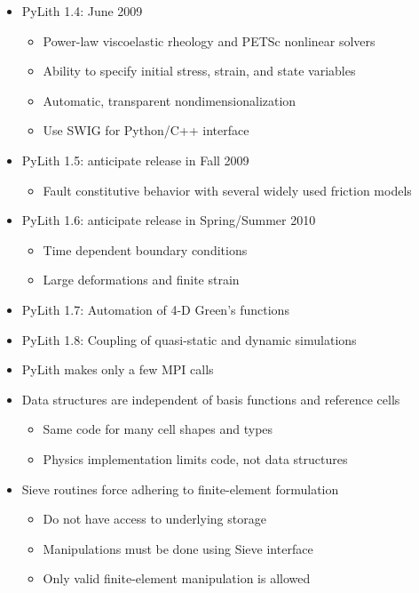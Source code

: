 \documentclass[pdftex,cig,slideColor]{pp4slides}
\begin{document}

  \begin{itemize}
  \item PyLith 1.4: June 2009
    \begin{itemize}
    \item Power-law viscoelastic rheology and PETSc nonlinear solvers
    \item Ability to specify initial stress, strain, and state variables
    \item Automatic, transparent nondimensionalization
    \item Use SWIG for Python/C++ interface
    \end{itemize}
  \item PyLith 1.5: anticipate release in Fall 2009
    \begin{itemize}
    \item Fault constitutive behavior with several widely used friction models
    \end{itemize}
  \item PyLith 1.6: anticipate release in Spring/Summer 2010
    \begin{itemize}
    \item Time dependent boundary conditions
    \item Large deformations and finite strain
    \end{itemize}
  \item PyLith 1.7: Automation of 4-D Green's functions
  \item PyLith 1.8: Coupling of quasi-static and dynamic simulations
  \end{itemize}
  
 
 \begin{itemize}
 \item PyLith makes only a few MPI calls
 \item Data structures are independent of basis functions and
   reference cells
   \begin{itemize}
   \item Same code for many cell shapes and types
   \item Physics implementation limits code, not data structures
   \end{itemize}
 \item Sieve routines force adhering to finite-element formulation
   \begin{itemize}
   \item Do not have access to underlying storage
   \item Manipulations must be done using Sieve interface
   \item Only valid finite-element manipulation is allowed
   \end{itemize}
 \end{itemize}
  
\end{document}
